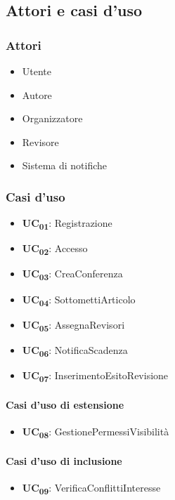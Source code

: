 \subsection{Attori e casi d'uso}
\label{sec:attori_casi_uso}
\subsubsection{Attori}
\label{sec:attori}
\begin{itemize}
\item Utente
\item Autore
\item Organizzatore
\item Revisore
\item Sistema di notifiche
\end{itemize}  

\subsubsection{Casi d'uso}
\label{sec:casi_uso}
\begin{itemize}
  \item \textbf{UC\textsubscript{01}}: Registrazione
  \item \textbf{UC\textsubscript{02}}: Accesso
  \item \textbf{UC\textsubscript{03}}: CreaConferenza
  \item \textbf{UC\textsubscript{04}}: SottomettiArticolo
  \item \textbf{UC\textsubscript{05}}: AssegnaRevisori
  \item \textbf{UC\textsubscript{06}}: NotificaScadenza
  \item \textbf{UC\textsubscript{07}}: InserimentoEsitoRevisione
\end{itemize}

\paragraph{Casi d'uso di estensione}
\begin{itemize}
  \item \textbf{UC\textsubscript{08}}: GestionePermessiVisibilità
\end{itemize}

\paragraph{Casi d'uso di inclusione}
\begin{itemize}
  \item \textbf{UC\textsubscript{09}}: VerificaConflittiInteresse
\end{itemize}

